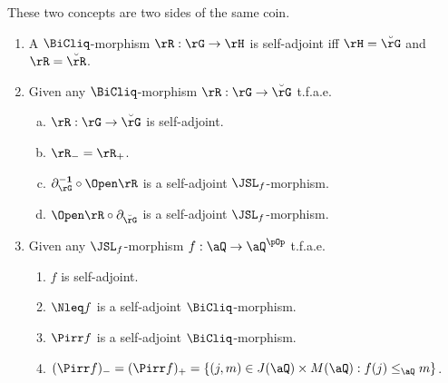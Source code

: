 \documentclass{article}
\begin{document}
\smallskip
These two concepts are two sides of the same coin.
\smallskip


\begin{lemma}
\label{lem:self_adjointness_bicliq_vs_jsl}
\item
\begin{enumerate}
\item
A $\BiCliq$-morphism $\rR : \rG \to \rH$ is self-adjoint iff $\rH = \breve{\rG}$ and $\rR = \breve{\rR}$.

\item
Given any $\BiCliq$-morphism $\rR : \rG \to \breve{\rG}$ t.f.a.e.\
\begin{enumerate}[a.]
\item
$\rR : \rG \to \breve{\rG}$ is self-adjoint.
\item
$\rR_- = \rR_+$.
\item
$\partial_\rG^{\bf-1} \circ \Open\rR$ is a self-adjoint $\JSL_f$-morphism.
\item
$\Open\rR \circ \partial_{\breve{\rG}}$ is a self-adjoint $\JSL_f$-morphism.
\end{enumerate}
 

\item
Given any $\JSL_f$-morphism $f : \aQ \to \aQ^{\pOp}$ t.f.a.e.\
\begin{enumerate}
\item
$f$ is self-adjoint.
\item
$\Nleq f$ is a self-adjoint $\BiCliq$-morphism.
\item
$\Pirr f$ is a self-adjoint $\BiCliq$-morphism.
\item
$(\Pirr f)_- 
= (\Pirr f)_+
= \{ (j,m) \in J(\aQ) \times M(\aQ) : f(j) \leq_\aQ m \}$.
\end{enumerate}

\end{enumerate}
\end{lemma}
\end{document}
